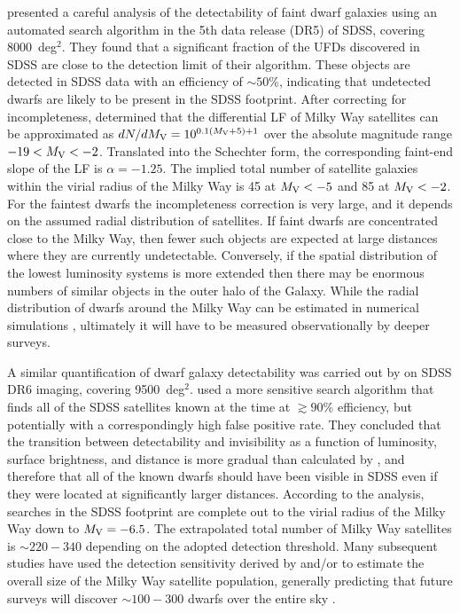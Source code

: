 \documentclass[a4paper]{ar-1col}
\begin{document}
\citet{koposov08} presented a careful analysis of the detectability of
faint dwarf galaxies using an automated search algorithm in the 5th
data release (DR5) of SDSS, covering 8000~deg$^{2}$.  They found that
a significant fraction of the UFDs discovered in SDSS are close to the
detection limit of their algorithm.  These objects are detected in
SDSS data with an efficiency of $\sim50$\%, indicating that undetected
dwarfs are likely to be present in the SDSS footprint.  After
correcting for incompleteness, \citeauthor{koposov08} determined that
the differential LF of Milky Way satellites can be approximated as
$dN/dM_{{\rm V}} = 10^{0.1(M_{{\rm V}}+5) + 1}$ over the absolute
magnitude range $-19 < M_{{\rm V}} < -2$.  Translated into the
Schechter form, the corresponding faint-end slope of the LF is $\alpha
= -1.25$.  The implied total number of satellite galaxies within the
virial radius of the Milky Way is 45 at $M_{{\rm V}} < -5$ and 85 at
$M_{{\rm V}} < -2$.  For the faintest dwarfs the incompleteness
correction is very large, and it depends on the assumed radial
distribution of satellites.  If faint dwarfs are concentrated close to
the Milky Way, then fewer such objects are expected at large distances
where they are currently undetectable.  Conversely, if the spatial
distribution of the lowest luminosity systems is more extended then
there may be enormous numbers of similar objects in the outer halo of
the Galaxy.  While the radial distribution of dwarfs around the Milky
Way can be estimated in numerical simulations
\citep[e.g.,][]{wang13,gk17b}, ultimately it will have to be measured
observationally by deeper surveys.

A similar quantification of dwarf galaxy detectability was carried out
by \citet{walsh09} on SDSS DR6 imaging, covering 9500~deg$^{2}$.
\citeauthor{walsh09} used a more sensitive search algorithm that finds
all of the SDSS satellites known at the time at $\gtrsim90$\%
efficiency, but potentially with a correspondingly high false positive
rate.  They concluded that the transition between detectability and
invisibility as a function of luminosity, surface brightness, and
distance is more gradual than calculated by \citet{koposov08}, and
therefore that all of the known dwarfs should have been visible in
SDSS even if they were located at significantly larger distances.
According to the \citet{walsh09} analysis, searches in the SDSS
footprint are complete out to the virial radius of the Milky Way down
to $M_{{\rm V}} = -6.5$.  The extrapolated total number of Milky Way
satellites is $\sim220-340$ depending on the adopted detection
threshold.  Many subsequent studies have used the detection
sensitivity derived by \citet{koposov08} and/or \citet{walsh09} to
estimate the overall size of the Milky Way satellite population,
generally predicting that future surveys will discover $\sim100-300$
dwarfs over the entire sky
\citep[e.g.,][]{tollerud08,hargis14,newton18,jethwa18}.
\end{document}

